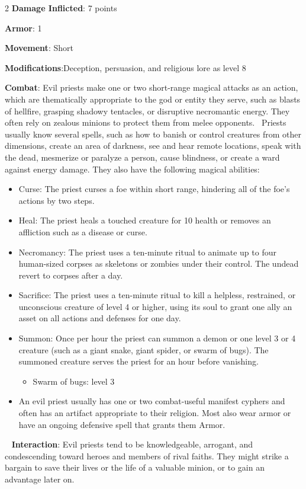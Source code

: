 \begin{multicols}{2}
\textbf{Damage Inflicted}: 7 points 

\textbf{Armor}: 1 

\textbf{Movement}: Short 

\textbf{Modifications}:Deception, persuasion, and religious lore as level 8 

\textbf{Combat}: Evil priests make one or two short-range magical attacks as an action, which are thematically appropriate to the god or entity they serve, such as blasts of hellfire, grasping shadowy tentacles, or disruptive necromantic energy. They often rely on zealous minions to protect them from melee opponents. 
Priests usually know several spells, such as how to banish or control creatures from other dimensions, create an area of darkness, see and hear remote locations, speak with the dead, mesmerize or paralyze a person, cause blindness, or create a ward against energy damage. They also have the following magical abilities: 

\begin{itemize}
\item  Curse: The priest curses a foe within short range, hindering all of the foe’s actions by two steps. 
\item  Heal: The priest heals a touched creature for 10 health or removes an affliction such as a disease or curse. 
\item  Necromancy: The priest uses a ten-minute ritual to animate up to four human-sized corpses as skeletons or zombies under their control. The undead revert to corpses after a day. 
\item  Sacrifice: The priest uses a ten-minute ritual to kill a helpless, restrained, or unconscious creature of level 4 or higher, using its soul to grant one ally an asset on all actions and defenses for one day. 
\item  Summon: Once per hour the priest can summon a demon or one level 3 or 4 creature (such as a giant snake, giant spider, or swarm of bugs). The summoned creature serves the priest for an hour before vanishing. 
\begin{itemize} 
\item Swarm of bugs: level 3
\end{itemize}
\item  An evil priest usually has one or two combat-useful manifest cyphers and often has an artifact appropriate to their religion. Most also wear armor or have an ongoing defensive spell that grants them Armor.
\end{itemize}
 
\textbf{Interaction}: Evil priests tend to be knowledgeable, arrogant, and condescending toward heroes and members of rival faiths. They might strike a bargain to save their lives or the life of a valuable minion, or to gain an advantage later on. 


\end{multicols}
